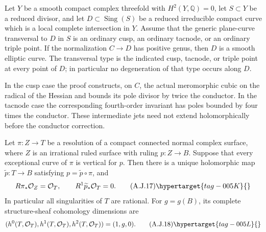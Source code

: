 \begin{proposition}\hypertarget{tag-01BF}{}\label{cdp:st:A.5.5}


Let $Y$ be a smooth compact complex threefold with
$H^2(Y,\mathbb Q)=0$, let $S\subset Y$ be a reduced divisor,
and let $D\subset\operatorname{Sing}(S)$ be a reduced
irreducible compact curve which is a local complete intersection
in $Y$. Assume that the generic plane-curve transversal to $D$
in $S$ is an ordinary cusp, an ordinary tacnode, or an ordinary
triple point.
If the normalization $C\to D$ has positive genus, then $D$ is
a smooth elliptic curve. The transversal type is the indicated
cusp, tacnode, or triple point at every point of $D$;
in particular no degeneration of that type occurs along $D$.

In the cusp case the proof constructs, on $C$, the actual
meromorphic cubic on the radical of the Hessian and bounds its
pole divisor by twice the conductor. In the tacnode case the
corresponding fourth-order invariant has poles bounded by four
times the conductor. These intermediate jets need not extend
holomorphically before the conductor correction.
\end{proposition}

\begin{proposition}\hypertarget{tag-01BI}{}\label{cdp:st:A.5.8}


Let $\pi:Z\to T$ be a resolution of a compact connected
normal complex surface, where $Z$ is an irrational ruled
surface with ruling $p:Z\to B$. Suppose that every
exceptional curve of $\pi$ is vertical for $p$.
Then there is a unique holomorphic map
$\widetilde p:T\to B$ satisfying
$p=\widetilde p\circ\pi$, and
\[
 R\pi_*\mathcal O_Z=\mathcal O_T,
 \qquad R^1\widetilde p_*\mathcal O_T=0.           \tag{A.J.17}\hypertarget{tag-005K}{}\label{cdp:eq:A.J.17}
\]
In particular all singularities of $T$ are rational. For
$g=g(B)$, its complete structure-sheaf cohomology dimensions
are
\[
 (h^0(T,\mathcal O_T),h^1(T,\mathcal O_T),
                         h^2(T,\mathcal O_T))=(1,g,0).
                                                        \tag{A.J.18}\hypertarget{tag-005L}{}\label{cdp:eq:A.J.18}
\]
\end{proposition}

